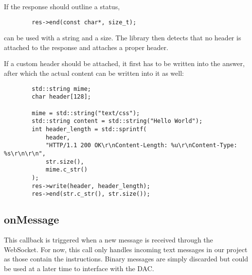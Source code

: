 If the response should outline a  status,
\vspace{2ex}
\begin{tcolorbox}[skin=alpenlisting]
    \begin{verbatim}
        res->end(const char*, size_t);
    \end{verbatim}
\end{tcolorbox}
\vspace{2ex}
\noindent can be used with a string  and a size. The library then detects that
no header  is attached  to the  response and attaches  a proper  
header.

If a  custom header should be  attached, it first  has to be written  into the
answer, after which the actual content can be written into it as well:
\vspace{4ex}
\begin{tcolorbox}[skin=alpenlisting]
    \begin{verbatim}
        std::string mime;
        char header[128];

        mime = std::string("text/css");
        std::string content = std::string("Hello World");
        int header_length = std::sprintf(
            header,
            "HTTP/1.1 200 OK\r\nContent-Length: %u\r\nContent-Type: %s\r\n\r\n",
            str.size(),
            mime.c_str()
        );
        res->write(header, header_length);
        res->end(str.c_str(), str.size());
    \end{verbatim}
\end{tcolorbox}


\clearpage
\subsection{onMessage} %
\label{subsec:devguide:server:onmessage}

This  callback  is triggered  when  a  new  message  is received  through  the
WebSocket.  For  now, this  call only  handles incoming  text messages  in our
project  as  those  contain  the instructions.   Binary  messages  are  simply
discarded but could be used at a later time to interface with the DAC.

